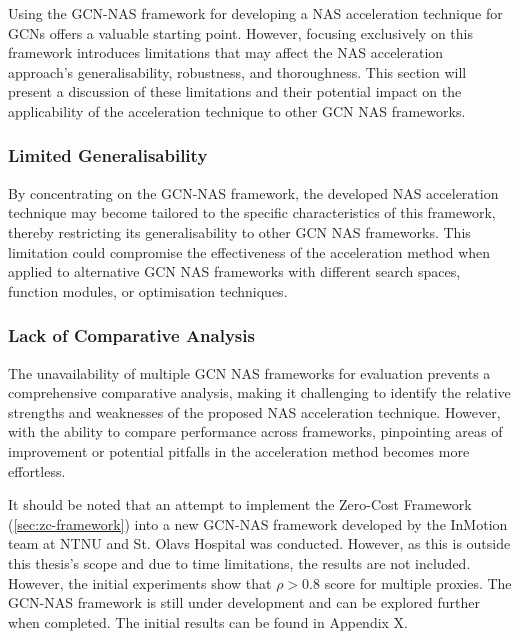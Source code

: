 Using the \gls{GCN}-\gls{NAS} framework for developing a \gls{NAS} acceleration technique for \glspl{GCN} offers a valuable starting point. However, focusing exclusively on this framework introduces limitations that may affect the \gls{NAS} acceleration approach's generalisability, robustness, and thoroughness. This section will present a discussion of these limitations and their potential impact on the applicability of the acceleration technique to other \gls{GCN} \gls{NAS} frameworks.

\subsubsection{Limited Generalisability}
By concentrating on the \gls{GCN}-\gls{NAS} framework, the developed \gls{NAS} acceleration technique may become tailored to the specific characteristics of this framework, thereby restricting its generalisability to other \gls{GCN} \gls{NAS} frameworks. This limitation could compromise the effectiveness of the acceleration method when applied to alternative \gls{GCN} \gls{NAS} frameworks with different search spaces, function modules, or optimisation techniques.

\subsubsection{Lack of Comparative Analysis}
The unavailability of multiple \gls{GCN} \gls{NAS} frameworks for evaluation prevents a comprehensive comparative analysis, making it challenging to identify the relative strengths and weaknesses of the proposed \gls{NAS} acceleration technique. However, with the ability to compare performance across frameworks, pinpointing areas of improvement or potential pitfalls in the acceleration method becomes more effortless. 

It should be noted that an attempt to implement the Zero-Cost Framework (\cref{sec:zc-framework}) into a new \gls{GCN}-\gls{NAS} framework developed by the InMotion team at \gls{NTNU} and St. Olavs Hospital was conducted. However, as this is outside this thesis's scope and due to time limitations, the results are not included. However, the initial experiments show that $ \rho >0.8$ score for multiple proxies. The \gls{GCN}-\gls{NAS} framework is still under development and can be explored further when completed. The initial results can be found in Appendix X. 

\begin{comment}
    
\kommentar{Usikker på om dette burde være her:}{The authors did attempt to implement the Zero-Cost Framework (\autoref{sec:zc-framework}) into the new \gls{GNN}-\gls{NAS} framework developed by the InMotion team at \gls{NTNU} and St. Olavs Hospital. However, as this is outside the scope of this thesis, the results are not included. However, the initial metrics show a $>0.8$ score for multiple proxies. The \gls{GNN}-\gls{NAS} framework is still under development and must be explored further when completed.}
\end{comment}


